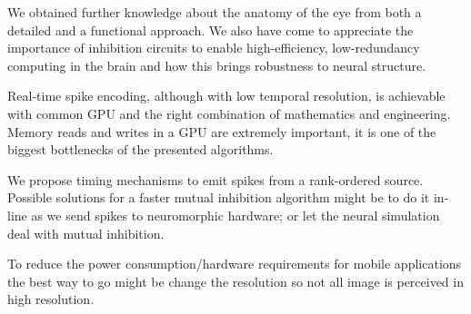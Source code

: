 We obtained further knowledge about the anatomy of the eye from both a detailed 
and a functional approach. We also have come to appreciate the importance of 
inhibition circuits to enable high-efficiency, low-redundancy computing in the 
brain and how this brings robustness to neural structure. 

Real-time spike encoding, although with low temporal resolution, is achievable 
with common GPU and the right combination of mathematics and 
engineering. Memory reads and writes in a GPU are extremely important, it is 
one of the biggest bottlenecks of the presented algorithms.

We propose timing mechanisms to emit spikes from a rank-ordered
source. Possible solutions for a faster mutual inhibition algorithm 
might be to do it in-line as we send spikes to neuromorphic hardware; 
or let the neural simulation deal with mutual inhibition.

To reduce the power consumption/hardware requirements for mobile applications 
the best way to go might be change the resolution so not all image is 
perceived in high resolution.


